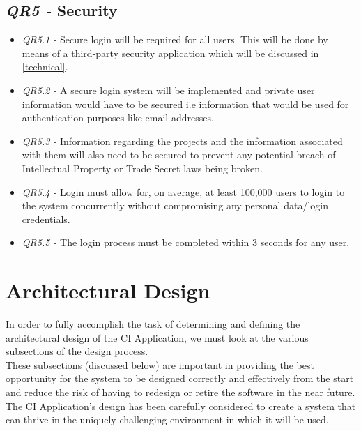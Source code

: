 \documentclass[11pt]{article}
\begin{document}
\subsection{\textit{QR5 -} Security}
\begin{itemize}
    \item \textit{QR5.1 -} Secure login will be required for all users. This will be done by means of a third-party security application which will be discussed in \ref{technical}.
    \item \textit{QR5.2 -} A secure login system will be implemented and private user information would have to be secured i.e information that would be used for authentication purposes like email addresses.
    \item \textit{QR5.3 -} Information regarding the projects and the information associated with them will also need to be secured to prevent any potential breach of Intellectual Property or Trade Secret laws being broken.
    \item \textit{QR5.4 -} Login must allow for, on average, at least 100,000 users to login to the system concurrently without compromising any personal data/login credentials.
    \item \textit{QR5.5 -} The login process must be completed within 3 seconds for any user.
    
\end{itemize}

\section{Architectural Design}
In order to fully accomplish the task of determining and defining the architectural design of the CI Application, we must look at the various subsections of the design process.\\[0.5cm]
These subsections (discussed below) are important in providing the best opportunity for the system to be designed correctly and effectively from the start and reduce the risk of having to redesign or retire the software in the near future.\\[0.5cm]
The CI Application's design has been carefully considered to create a system that can thrive in the uniquely challenging environment in which it will be used.\\[0.5cm]
\end{document}

